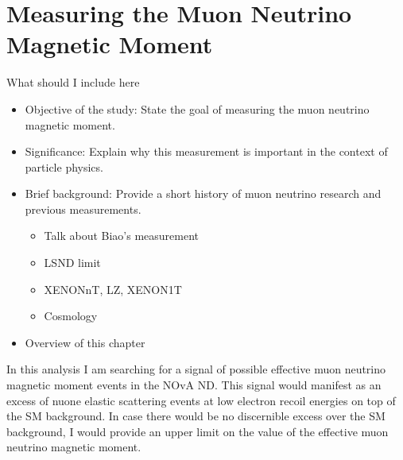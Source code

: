 \chapter{Measuring the Muon Neutrino Magnetic Moment}\label{sec:NeutrinoMagMoment}

What should I include here
\begin{itemize}
\item Objective of the study: State the goal of measuring the muon neutrino magnetic moment.
\item Significance: Explain why this measurement is important in the context of particle physics.
\item Brief background: Provide a short history of muon neutrino research and previous measurements.
\begin{itemize}
\item Talk about Biao's measurement
\item LSND limit
\item XENONnT, LZ, XENON1T
\item Cosmology
\end{itemize}
\item Overview of this chapter
\end{itemize}

In this analysis I am searching for a signal of possible effective muon neutrino magnetic moment events in the \gls{NOvA} \gls{ND}. This signal would manifest as an excess of \gls{nuone} elastic scattering events at low electron recoil energies on top of the \gls{SM} background. In case there would be no discernible excess over the \gls{SM} background, I would provide an upper limit on the value of the effective muon neutrino magnetic moment.




